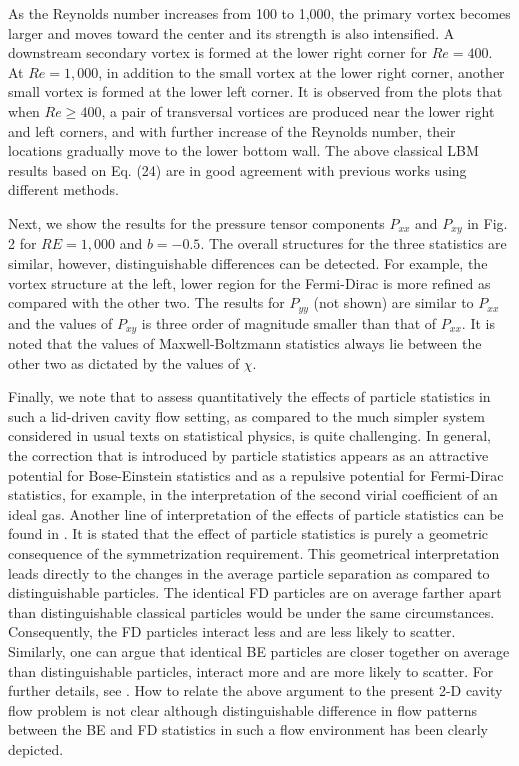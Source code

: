 \documentclass[doublecol]{epl2}
\begin{document}
As the Reynolds number increases from 100 to 1,000, the primary vortex becomes larger and moves toward the center and its strength is also intensified. A downstream secondary vortex is formed at the lower right corner for $Re=400$.  At $Re=1,000$, in addition to the small vortex at the lower right corner, another small vortex is formed at the lower left corner. It is observed from the plots that when $Re \ge 400$, a pair of transversal vortices are produced near the lower right and left corners, and with further increase of the Reynolds number, their locations gradually move to the lower bottom wall. The above classical LBM results based on Eq. (24) are in good agreement with previous works \cite{Yang1998,Alben2005} using different methods.

Next, we show the results for the pressure tensor components $P_{xx}$ and $P_{xy}$ in Fig. 2 for $RE=1,000$ and $b=-0.5$.  The overall structures for the three statistics are similar, however, distinguishable differences can be detected.  For example, the vortex structure at the left, lower region for the Fermi-Dirac is more refined as compared with the other two. The results for $P_{yy}$ (not shown) are similar to $P_{xx}$ and the values of $P_{xy}$ is three order of magnitude smaller than that of $P_{xx}$.  It is noted that the values of Maxwell-Boltzmann statistics always lie between the other two as dictated by the values of $\chi$.

Finally, we note that to assess quantitatively the effects of particle statistics in such a lid-driven cavity flow setting, as compared to the much simpler system considered in usual texts on statistical physics, is quite challenging. In general, the correction that is introduced by particle statistics appears as an attractive potential for Bose-Einstein statistics and as a repulsive potential for Fermi-Dirac statistics, for example, in the interpretation of the second virial coefficient of an ideal gas. Another line of interpretation of the effects of particle statistics can be found in \cite{Mullin2003}.
It is stated that the effect of particle statistics is purely a geometric consequence of the symmetrization requirement. This geometrical interpretation leads directly to the changes in the average particle separation as compared to distinguishable particles. The identical FD particles are on average farther apart than distinguishable classical particles would be under the same circumstances. Consequently, the FD particles interact less and are less likely to scatter. Similarly, one can argue that identical BE particles are closer together on average than distinguishable particles, interact more and are more likely to scatter. For further details, see \cite{Mullin2003}. How to relate the above argument to the present 2-D cavity flow problem is not clear although distinguishable difference in flow patterns between the BE and FD statistics in such a flow environment has been clearly depicted.
\end{document}
